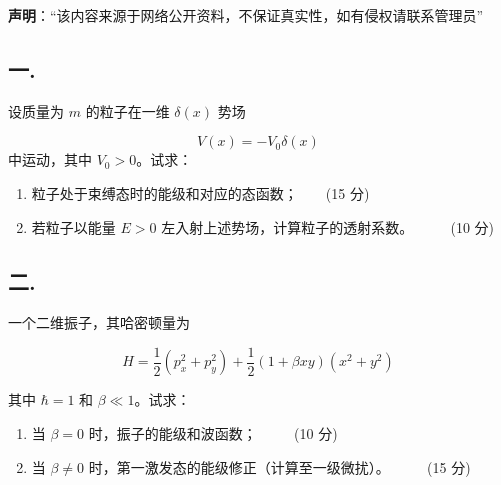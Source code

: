 
\textbf{声明}：“该内容来源于网络公开资料，不保证真实性，如有侵权请联系管理员”

\subsection{一.}
设质量为 $m$ 的粒子在一维 $\delta(x)$ 势场

\[
V(x) = -V_0 \delta(x)~
\]
中运动，其中 $V_0 > 0$。试求：

\begin{enumerate}
    \item 粒子处于束缚态时的能级和对应的态函数；$\qquad $(15 分)
    \item 若粒子以能量 $E > 0$ 左入射上述势场，计算粒子的透射系数。 $\qquad $ (10 分)
\end{enumerate}
\subsection{二.}
 一个二维振子，其哈密顿量为

\[
H = \frac{1}{2} (p_x^2 + p_y^2) + \frac{1}{2} (1 + \beta xy)(x^2 + y^2)~
\]

其中 $\hbar = 1$ 和 $\beta \ll 1$。试求：

\begin{enumerate}
    \item 当 $\beta = 0$ 时，振子的能级和波函数； $\qquad $ (10 分)
    \item 当 $\beta \neq 0$ 时，第一激发态的能级修正（计算至一级微扰）。 $\qquad $ (15 分)
\end{enumerate}
